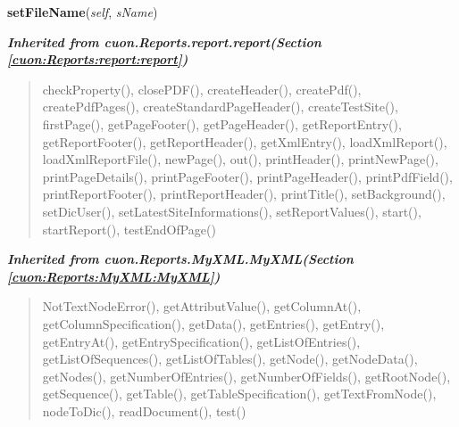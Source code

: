 \hspace{.8\funcindent}\begin{boxedminipage}{\funcwidth}

    \raggedright \textbf{setFileName}(\textit{self}, \textit{sName})

\setlength{\parskip}{2ex}
\setlength{\parskip}{1ex}
    \end{boxedminipage}


\large{\textbf{\textit{Inherited from cuon.Reports.report.report\textit{(Section \ref{cuon:Reports:report:report})}}}}

\begin{quote}
checkProperty(), closePDF(), createHeader(), createPdf(), createPdfPages(), createStandardPageHeader(), createTestSite(), firstPage(), getPageFooter(), getPageHeader(), getReportEntry(), getReportFooter(), getReportHeader(), getXmlEntry(), loadXmlReport(), loadXmlReportFile(), newPage(), out(), printHeader(), printNewPage(), printPageDetails(), printPageFooter(), printPageHeader(), printPdfField(), printReportFooter(), printReportHeader(), printTitle(), setBackground(), setDicUser(), setLatestSiteInformations(), setReportValues(), start(), startReport(), testEndOfPage()
\end{quote}

\large{\textbf{\textit{Inherited from cuon.Reports.MyXML.MyXML\textit{(Section \ref{cuon:Reports:MyXML:MyXML})}}}}

\begin{quote}
NotTextNodeError(), getAttributValue(), getColumnAt(), getColumnSpecification(), getData(), getEntries(), getEntry(), getEntryAt(), getEntrySpecification(), getListOfEntries(), getListOfSequences(), getListOfTables(), getNode(), getNodeData(), getNodes(), getNumberOfEntries(), getNumberOfFields(), getRootNode(), getSequence(), getTable(), getTableSpecification(), getTextFromNode(), nodeToDic(), readDocument(), test()
\end{quote}
